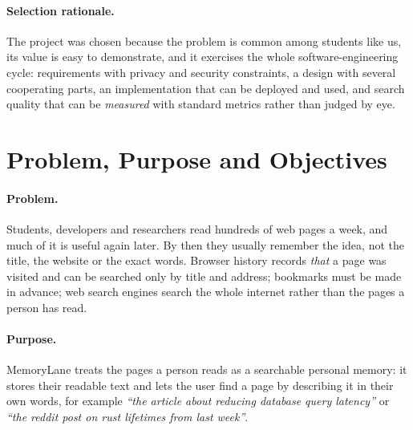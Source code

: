 \paragraph{Selection rationale.} The project was chosen because the problem
is common among students like us, its value is easy to demonstrate, and it
exercises the whole software-engineering
cycle: requirements with privacy and security constraints, a design with
several cooperating parts, an implementation that can be deployed and used,
and search quality that can be \emph{measured} with standard metrics rather
than judged by eye.

\section{Problem, Purpose and Objectives}

\paragraph{Problem.} Students, developers and researchers read hundreds of
web pages a week, and much of it is useful again later. By then they usually
remember the idea, not the title, the website or the exact words. Browser
history records \emph{that} a page was visited and can be searched only by
title and address; bookmarks must be made in advance; web search engines
search the whole internet rather than the pages a person has read.

\paragraph{Purpose.} MemoryLane treats the pages a person reads as a
searchable personal memory: it stores their readable text and lets the user
find a page by describing it in their own words, for example
\textit{``the article about reducing database query latency''} or
\textit{``the reddit post on rust lifetimes from last week''}.

